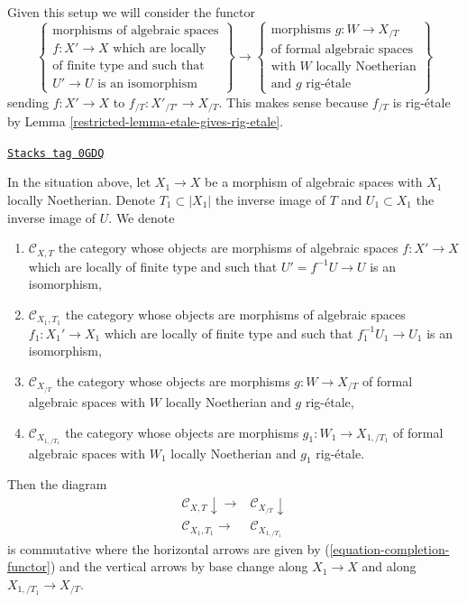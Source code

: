 \medskip\noindent
Given this setup we will consider the functor
\begin{equation}
\label{equation-completion-functor}
\left\{
\begin{matrix}
\text{morphisms of algebraic spaces}\\
f : X' \to X\text{ which are locally}\\
\text{of finite type and such that}\\
U' \to U\text{ is an isomorphism}
\end{matrix}
\right\}
\longrightarrow
\left\{
\begin{matrix}
\text{morphisms }g : W \to X_{/T}\\
\text{of formal algebraic spaces}\\
\text{with }W\text{ locally Noetherian}\\
\text{and }g\text{ rig-\'etale}
\end{matrix}
\right\}
\end{equation}
sending $f : X' \to X$ to $f_{/T} : X'_{/T'} \to X_{/T}$.
This makes sense because $f_{/T}$ is rig-\'etale by
Lemma \ref{restricted-lemma-etale-gives-rig-etale}.

\begin{lemma}
\label{restricted-lemma-functoriality-completion-functor}
\href{https://stacks.math.columbia.edu/tag/0GDQ}{\texttt{Stacks tag 0GDQ}}

In the situation above, let $X_1 \to X$ be a morphism of algebraic
spaces with $X_1$ locally Noetherian. Denote $T_1 \subset |X_1|$
the inverse image of $T$ and $U_1 \subset X_1$ the inverse image of $U$.
We denote
\begin{enumerate}
\item $\mathcal{C}_{X, T}$ the category whose objects are
morphisms of algebraic spaces $f : X' \to X$ which are locally
of finite type and such that $U' = f^{-1}U \to U$ is an isomorphism,
\item $\mathcal{C}_{X_1, T_1}$ the category whose objects are
morphisms of algebraic spaces $f_1 : X_1' \to X_1$ which are locally
of finite type and such that $f_1^{-1}U_1 \to U_1$ is an isomorphism,
\item $\mathcal{C}_{X_{/T}}$ the category whose objects are
morphisms $g : W \to X_{/T}$ of formal algebraic spaces
with $W$ locally Noetherian and $g$ rig-\'etale,
\item $\mathcal{C}_{X_{1, /T_1}}$ the category whose objects are
morphisms $g_1 : W_1 \to X_{1, /T_1}$ of formal algebraic spaces
with $W_1$ locally Noetherian and $g_1$ rig-\'etale.
\end{enumerate}
Then the diagram
$$
\begin{array}{cc}\mathcal{C}_{X, T} \downarrow\longrightarrow & \mathcal{C}_{X_{/T}} \downarrow \\ \mathcal{C}_{X_1, T_1} \longrightarrow & \mathcal{C}_{X_{1, /T_1}}\end{array}
$$
is commutative where the horizontal arrows are given by
(\ref{equation-completion-functor})
and the vertical arrows by base change along
$X_1 \to X$ and along $X_{1, /T_1} \to X_{/T}$.
\end{lemma}

